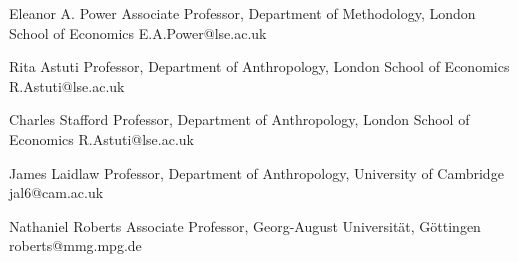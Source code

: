 

\begin{cvreferences}

  \cvreference
    {Eleanor A. Power} %
    {Associate Professor, Department of Methodology, London School of Economics} %
    {E.A.Power@lse.ac.uk}

  \cvreference
    {Rita Astuti} %
    {Professor, Department of Anthropology, London School of Economics} %
    {R.Astuti@lse.ac.uk}



  \cvreference
    {Charles Stafford} %
    {Professor, Department of Anthropology, London School of Economics} %
    {R.Astuti@lse.ac.uk}


\end{cvreferences}


\begin{cvreferences}

  \cvreference
    {James Laidlaw} %
    {Professor, Department of Anthropology, University of Cambridge} %
    {jal6@cam.ac.uk}

  \cvreference
    {Nathaniel Roberts} %
    {Associate Professor, Georg-August Universität, Göttingen} %
    {roberts@mmg.mpg.de}

\end{cvreferences}
